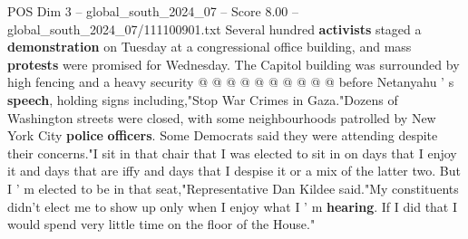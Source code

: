 \begin{textsample}{POS Dim 3 – global\_south\_2024\_07 – Score 8.00 – global\_south\_2024\_07/111100901.txt}
Several hundred \textbf{activists} staged a \textbf{demonstration} on Tuesday at a congressional office building, and mass \textbf{protests} were promised for Wednesday.
The Capitol building was surrounded by high fencing and a heavy security @ @ @ @ @ @ @ @ @ @ before Netanyahu ' s \textbf{speech}, holding signs including,"Stop War Crimes in Gaza."Dozens of Washington streets were closed, with some neighbourhoods patrolled by New York City \textbf{police} \textbf{officers}.
Some Democrats said they were attending despite their concerns."I sit in that chair that I was elected to sit in on days that I enjoy it and days that are iffy and days that I despise it or a mix of the latter two.
But I ' m elected to be in that seat,"Representative Dan Kildee said."My constituents didn't elect me to show up only when I enjoy what I ' m \textbf{hearing}.
If I did that I would spend very little time on the floor of the House."

\end{textsample}
